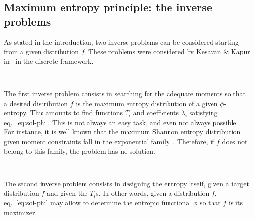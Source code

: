 \documentclass[entropy,article,submit,moreauthors,pdftex]{Definitions/mdpi}
\begin{document}

\subsection{Maximum entropy principle: the inverse problems}
\label{subsec:MaxPhiEntInverse}

As stated in  the introduction, two inverse problems can  be considered starting
from a  given distribution  $f$. These  problems were  considered by  Kesavan \&
Kapur in~\cite{KesKap89} in the discrete framework.

\

The first inverse problem consists in searching for the adequate moments so that
a  desired distribution  $f$  is the  maximum entropy  distribution  of a  given
$\phi$-entropy.   This   amounts  to  find  functions   $T_i$  and  coefficients
$\lambda_i$ satisfying eq.~\eqref{eq:sol-phi}.  This is not always an easy task,
and even not  always possible. For instance,  it is well known  that the maximum
Shannon entropy  distribution given moment  constraints fall in  the exponential
family~\cite{CovTho06, BorLew91:05, Arn01, MezMon09}. Therefore, if $f$ does not
belong to this family, the problem has no solution.


\

The second  inverse problem consists  in designing  the entropy itself,  given a
target  distribution  $f$  and  given  the $T_i$s.   In  other  words,  given  a
distribution  $f$, eq.~\eqref{eq:sol-phi}  may allow  to determine  the entropic
functional $\phi$ so that $f$ is its maximizer.
\end{document}
